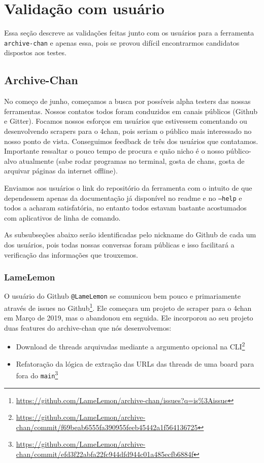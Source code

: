 \section{Validação com usuário}\label{sec:val-usr}

Essa seção descreve as validações feitas junto com os usuários para a ferramenta \texttt{archive-chan} e apenas essa, pois se provou difícil encontrarmos candidatos dispostos aos testes.

\subsection{Archive-Chan}

No começo de junho, começamos a busca por possíveis alpha testers das nossas ferramentas.
Nossos contatos todos foram conduzidos em canais públicos (Github e Gitter).
Focamos nossos esforços em usuários que estivessem comentando ou desenvolvendo scrapers para o 4chan, pois seriam o público mais interessado no nosso ponto de vista.
Conseguimos feedback de três dos usuários que contatamos.
Importante ressaltar o pouco tempo de procura e quão nicho é o nosso público-alvo atualmente (sabe rodar programas no terminal, gosta de chans, gosta de arquivar páginas da internet offline).

Enviamos aos usuários o link do repositório da ferramenta com o intuito de que dependessem apenas da documentação já disponível no readme e no \texttt{--help} e todos a acharam satisfatória, no entanto todos estavam bastante acostumados com aplicativos de linha de comando.

As subsubseções abaixo serão identificadas pelo nickname do Github de cada um dos usuários, pois todas nossas conversas foram públicas e isso facilitará a verificação das informações que trouxemos.

\subsubsection{LameLemon}

O usuário do Github \texttt{@LameLemon} se comunicou bem pouco e primariamente através de issues no Github\footnote{\url{https://github.com/LameLemon/archive-chan/issues?q=is\%3Aissue}}.
Ele começara um projeto de scraper para o 4chan em Março de 2019, mas o abandonou em seguida.
Ele incorporou ao seu projeto duas features do archive-chan que nós desenvolvemos:

\begin{itemize}
    \item Download de threads arquivadas mediante a argumento opcional na CLI\footnote{\url{https://github.com/LameLemon/archive-chan/commit/f69beab6555fa390955feeb45442a1f564136725}}
    \item Refatoração da lógica de extração das URLs das threads de uma board para fora do \texttt{main}\footnote{\url{https://github.com/LameLemon/archive-chan/commit/efd3f22abfa22fc944dfd944c01a485ecfb6884f}}
\end{itemize}

